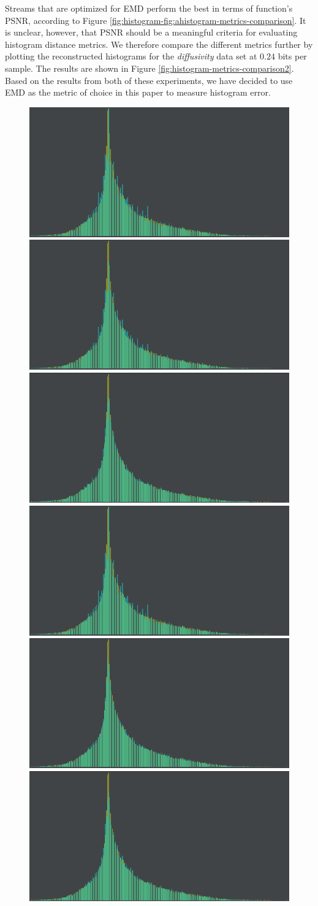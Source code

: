 Streams that are optimized for EMD perform the best in terms of function's PSNR, according to Figure
\ref{fig:histogram-fig:ahistogram-metrics-comparison}. It is unclear, however, that PSNR should be a
meaningful criteria for evaluating histogram distance metrics. We therefore compare the different
metrics further by plotting the reconstructed histograms for the \emph{diffusivity} data set at
$0.24$ bits per sample. The results are shown in Figure \ref{fig:histogram-metrics-comparison2}.
Based on the results from both of these experiments, we have decided to use EMD as the metric of
choice in this paper to measure histogram error.

\begin{figure}
	\centering
	{\includegraphics[width=0.24\linewidth]{img/histogram/different-metrics/bhattacharyya.png}}
	{\includegraphics[width=0.24\linewidth]{img/histogram/different-metrics/chi_square.png}}
	{\includegraphics[width=0.24\linewidth]{img/histogram/different-metrics/emd.png}}
	{\includegraphics[width=0.24\linewidth]{img/histogram/different-metrics/hellinger.png}}
	{\includegraphics[width=0.24\linewidth]{img/histogram/different-metrics/total_variation.png}}
	{\includegraphics[width=0.24\linewidth]{img/histogram/different-metrics/intersection.png}}

\end{figure}
